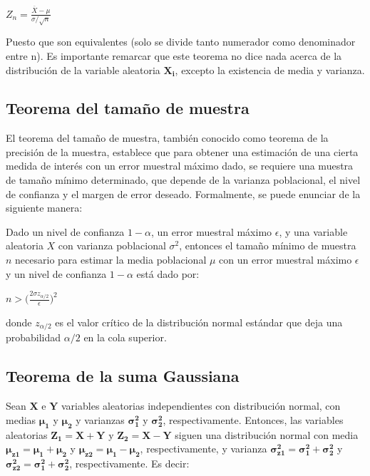 \documentclass[es-lat]{article}
\begin{document}
\begin{center}
    $Z_{n}=\frac{\overline{X}-\mu}{\sigma/\sqrt{n}}$
\end{center}

Puesto que son equivalentes (solo se divide tanto numerador como denominador entre n). Es importante remarcar que este teorema no dice nada acerca de la distribución de la variable aleatoria $\mathbf{X_{i}}$, excepto la existencia de media y varianza.


\subsection{Teorema del tamaño de muestra}
El teorema del tamaño de muestra, también conocido como teorema de la precisión de la muestra, establece que para obtener una estimación de una cierta medida de interés con un error muestral máximo dado, se requiere una muestra de tamaño mínimo determinado, que depende de la varianza poblacional, el nivel de confianza y el margen de error deseado. Formalmente, se puede enunciar de la siguiente manera:

Dado un nivel de confianza $1-\alpha$, un error muestral máximo $\epsilon$, y una variable aleatoria $X$ con varianza poblacional $\sigma^2$, entonces el tamaño mínimo de muestra $n$ necesario para estimar la media poblacional $\mu$ con un error muestral máximo $\epsilon$ y un nivel de confianza $1-\alpha$ está dado por:

\begin{center}
    $ n > \Bigg( \frac{2 \sigma z_{\alpha/2}}{\epsilon} \Bigg) ^2 $
\end{center}

donde $z_{\alpha/2}$ es el valor crítico de la distribución normal estándar que deja una probabilidad $\alpha/2$ en la cola superior.

\subsection{Teorema de la suma Gaussiana}

Sean $\mathbf{X}$ e $\mathbf{Y}$ variables aleatorias independientes con distribución normal, con medias $\mathbf{\mu_{1}}$ y $\mathbf{\mu_{2}}$ y varianzas $\mathbf{\sigma_{1}^2}$ y $\mathbf{\sigma_{2}^2}$, respectivamente. Entonces, las variables aleatorias $\mathbf{Z_{1} = X + Y}$ y $\mathbf{Z_{2} = X - Y}$ siguen una distribución normal con media $\mathbf{\mu_{z1} = \mu_{1} + \mu_{2}}$ y $\mathbf{\mu_{z2} = \mu_{1} - \mu_{2}}$, respectivamente, y varianza $\mathbf{\sigma_{z1}^2 = \sigma_{1}^2 + \sigma_{2}^2}$ y $\mathbf{\sigma_{z2}^2 = \sigma_{1}^2 + \sigma_{2}^2}$, respectivamente. Es decir:
\end{document}
